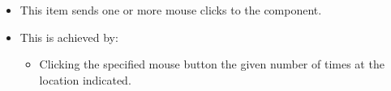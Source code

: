 \begin{itemize}
\item This item sends one or more mouse clicks to the component.
\item This is achieved by:
\begin{itemize}
\item Clicking the specified mouse button the given number of times at the location indicated.
\end{itemize}
\end{itemize}

